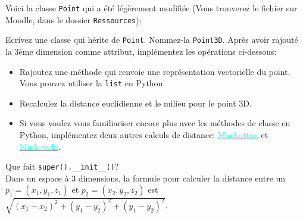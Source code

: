 \begin{Exercice}[15 minutes]
Voici la classe \lstinline{Point} qui a été légèrement modifiée (Vous trouverez le fichier sur Moodle, dans le dossier \lstinline{Ressources}):
 

Ecrivez une classe qui hérite de \lstinline{Point}. Nommez-la \lstinline{Point3D}. Après avoir rajouté la 3ème dimension comme attribut, implémentez les opérations ci-dessous:

\begin{itemize}
	\item Rajoutez une méthode qui renvoie une représentation vectorielle du point. Vous pouvez utiliser la \lstinline{list} en Python.
	\item Recalculez la distance euclidienne et le milieu pour le point 3D.
	\item \advanced Si vous voulez vous familiariser encore plus avec les méthodes de classe en Python, implémentez deux autres calculs de distance: \href{https://fr.wikipedia.org/wiki/Distance_de_Manhattan}{\textcolor{cyan}{Manhattan}} et \href{https://en.wikipedia.org/wiki/Minkowski_distance}{\textcolor{cyan}{Minkowski}}.
\end{itemize}
 

\begin{conseil}

Que fait \lstinline{super().__init__()}?\\
Dans un espace à 3 dimensions, la formule pour calculer la distance entre un $p_1 = (x_1, y_1, z_1)$ et $p_2 = (x_2, y_2, z_2)$ est $\sqrt{(x_1 - x_2)^2 + (y_1 - y_2)^2 + (y_1 - y_2)^2}$.
\end{conseil}
\begin{solution}
 
\end{solution}
\end{Exercice} 

